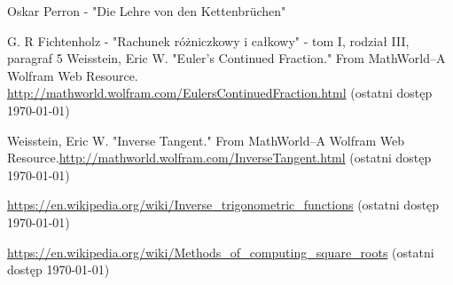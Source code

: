 \documentclass{article}
\begin{document}
\begin{thebibliography}{9}
	\itemsep2pt
	
		 Oskar Perron - "Die Lehre von den Kettenbrüchen"
		
		 G. R Fichtenholz - "Rachunek różniczkowy i całkowy" - tom I, rodział III, paragraf 5
	 Weisstein, Eric W. "Euler's Continued Fraction." From MathWorld--A Wolfram Web Resource. \url{http://mathworld.wolfram.com/EulersContinuedFraction.html}
	(ostatni dostęp \today)
	
	
	Weisstein, Eric W. "Inverse Tangent." From MathWorld--A Wolfram Web Resource.\url{http://mathworld.wolfram.com/InverseTangent.html} 
	(ostatni dostęp \today)
	 
	
	 \url{https://en.wikipedia.org/wiki/Inverse_trigonometric_functions}
	(ostatni dostęp \today)
	
	\url{https://en.wikipedia.org/wiki/Methods_of_computing_square_roots}
	(ostatni dostęp \today)
	
\end{thebibliography}
\end{document}
